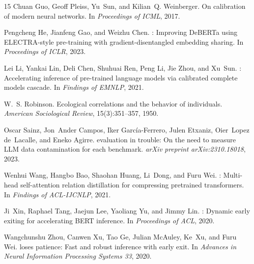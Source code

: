 \documentclass[11pt]{article}
\begin{document}
\begin{thebibliography}{15}
Chuan Guo, Geoff Pleiss, Yu~Sun, and Kilian~Q. Weinberger.
\newblock On calibration of modern neural networks.
\newblock In \emph{Proceedings of ICML}, 2017.

Pengcheng He, Jianfeng Gao, and Weizhu Chen.
: Improving {DeBERTa} using {ELECTRA}-style pre-training
  with gradient-disentangled embedding sharing.
\newblock In \emph{Proceedings of ICLR}, 2023.

Lei Li, Yankai Lin, Deli Chen, Shuhuai Ren, Peng Li, Jie Zhou, and Xu~Sun.
: Accelerating inference of pre-trained language models
  via calibrated complete models cascade.
\newblock In \emph{Findings of EMNLP}, 2021.

W.~S. Robinson.
\newblock Ecological correlations and the behavior of individuals.
\newblock \emph{American Sociological Review}, 15(3):351--357, 1950.

Oscar Sainz, Jon~Ander Campos, Iker Garc\'ia-Ferrero, Julen Etxaniz, Oier~Lopez
  de~Lacalle, and Eneko Agirre.
 evaluation in trouble: On the need to measure {LLM} data
  contamination for each benchmark.
\newblock \emph{arXiv preprint arXiv:2310.18018}, 2023.

Wenhui Wang, Hangbo Bao, Shaohan Huang, Li~Dong, and Furu Wei.
: Multi-head self-attention relation distillation for
  compressing pretrained transformers.
\newblock In \emph{Findings of ACL-IJCNLP}, 2021.

Ji~Xin, Raphael Tang, Jaejun Lee, Yaoliang Yu, and Jimmy Lin.
: Dynamic early exiting for accelerating {BERT} inference.
\newblock In \emph{Proceedings of ACL}, 2020.

Wangchunshu Zhou, Canwen Xu, Tao Ge, Julian McAuley, Ke~Xu, and Furu Wei.
 loses patience: Fast and robust inference with early exit.
\newblock In \emph{Advances in Neural Information Processing Systems 33}, 2020.

\end{thebibliography}

\appendix
\end{document}
